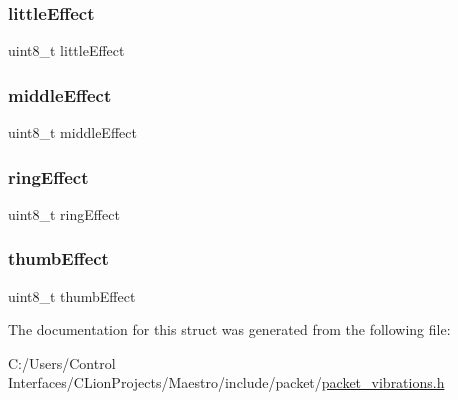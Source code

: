 \subsubsection{\texorpdfstring{little\+Effect}{littleEffect}}
{\footnotesize\ttfamily uint8\+\_\+t little\+Effect}

\mbox{\label{struct_vibration_effects_a6ded34d8663a70c8781258e2fed74c2f}} 
\subsubsection{\texorpdfstring{middle\+Effect}{middleEffect}}
{\footnotesize\ttfamily uint8\+\_\+t middle\+Effect}

\mbox{\label{struct_vibration_effects_a0bc08c517fd75c56e8cec76389a596d6}} 
\subsubsection{\texorpdfstring{ring\+Effect}{ringEffect}}
{\footnotesize\ttfamily uint8\+\_\+t ring\+Effect}

\mbox{\label{struct_vibration_effects_a7f845267ae38f6e155a7e4d63a4a95ee}} 
\subsubsection{\texorpdfstring{thumb\+Effect}{thumbEffect}}
{\footnotesize\ttfamily uint8\+\_\+t thumb\+Effect}



The documentation for this struct was generated from the following file\+:\begin{DoxyCompactItemize}
\item 
C\+:/\+Users/\+Control Interfaces/\+C\+Lion\+Projects/\+Maestro/include/packet/\hyperlink{packet__vibrations_8h}{packet\+\_\+vibrations.\+h}\end{DoxyCompactItemize}
